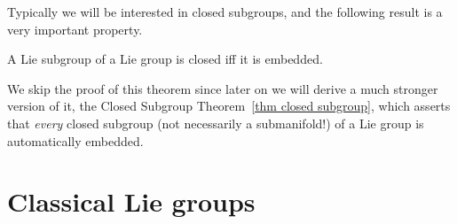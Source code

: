 Typically we will be interested in closed subgroups, and the following result is a very important property.

\begin{thm}\label{thm 7.21 Lee}
    A Lie subgroup of a Lie group is closed iff it is embedded.
\end{thm}

We skip the proof of this theorem since later on we will derive a much stronger version of it, the Closed Subgroup Theorem~\ref{thm closed subgroup}, which asserts that \emph{every} closed subgroup (not necessarily a submanifold!) of a Lie group is automatically embedded.









\section{Classical Lie groups}\label{sec: classical groups}


